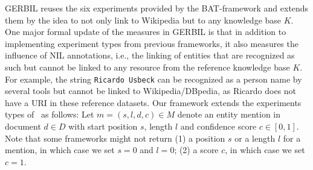GERBIL reuses the six experiments provided by the BAT-framework and extends them by the idea to not only link to Wikipedia but to any knowledge base $K$.
One major formal update of the measures in GERBIL is that in addition to implementing experiment types from previous frameworks, it also measures the influence of NIL annotations, i.e., the linking of entities that are recognized as such but cannot be linked to any resource from the reference knowledge base $K$. For example, the string \texttt{Ricardo Usbeck} can be recognized as a person name by several tools but cannot be linked to Wikipedia/DBpedia, as Ricardo does not have a URI in these reference datasets. 
Our framework extends the experiments types of~\cite{cornolti} as follows: Let $m=(s,l,d,c) \in M$ denote an entity mention in document $d \in D$ with start position $s$, length $l$ and confidence score $c \in [0,1]$.
Note that some frameworks might not return (1) a position $s$ or a length $l$ for a mention, in which case we set $s=0$ and $l=0$; (2) a score $c$, in which case we set $c=1$.

